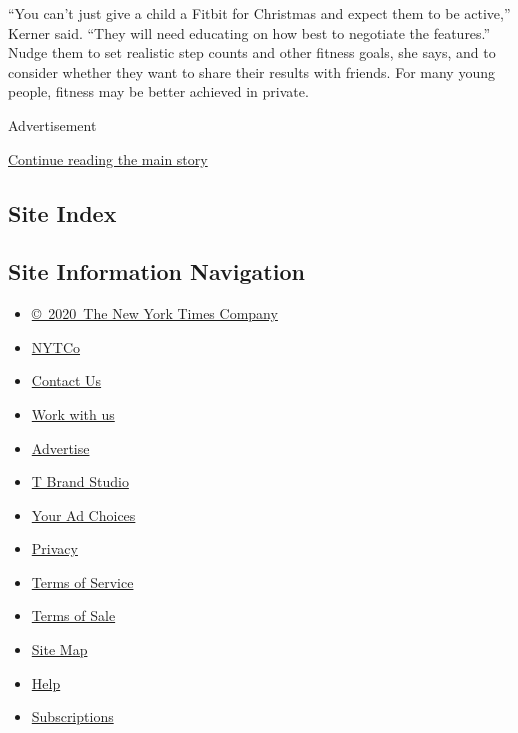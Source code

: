 ``You can't just give a child a Fitbit for Christmas and expect them to
be active,'' Kerner said. ``They will need educating on how best to
negotiate the features.'' Nudge them to set realistic step counts and
other fitness goals, she says, and to consider whether they want to
share their results with friends. For many young people, fitness may be
better achieved in private.

Advertisement

\protect\hyperlink{after-bottom}{Continue reading the main story}

\hypertarget{site-index}{%
\subsection{Site Index}\label{site-index}}

\hypertarget{site-information-navigation}{%
\subsection{Site Information
Navigation}\label{site-information-navigation}}

\begin{itemize}
\tightlist
\item
  \href{https://help.nytimes3xbfgragh.onion/hc/en-us/articles/115014792127-Copyright-notice}{©~2020~The
  New York Times Company}
\end{itemize}

\begin{itemize}
\tightlist
\item
  \href{https://www.nytco.com/}{NYTCo}
\item
  \href{https://help.nytimes3xbfgragh.onion/hc/en-us/articles/115015385887-Contact-Us}{Contact
  Us}
\item
  \href{https://www.nytco.com/careers/}{Work with us}
\item
  \href{https://nytmediakit.com/}{Advertise}
\item
  \href{http://www.tbrandstudio.com/}{T Brand Studio}
\item
  \href{https://www.nytimes3xbfgragh.onion/privacy/cookie-policy\#how-do-i-manage-trackers}{Your
  Ad Choices}
\item
  \href{https://www.nytimes3xbfgragh.onion/privacy}{Privacy}
\item
  \href{https://help.nytimes3xbfgragh.onion/hc/en-us/articles/115014893428-Terms-of-service}{Terms
  of Service}
\item
  \href{https://help.nytimes3xbfgragh.onion/hc/en-us/articles/115014893968-Terms-of-sale}{Terms
  of Sale}
\item
  \href{https://spiderbites.nytimes3xbfgragh.onion}{Site Map}
\item
  \href{https://help.nytimes3xbfgragh.onion/hc/en-us}{Help}
\item
  \href{https://www.nytimes3xbfgragh.onion/subscription?campaignId=37WXW}{Subscriptions}
\end{itemize}
